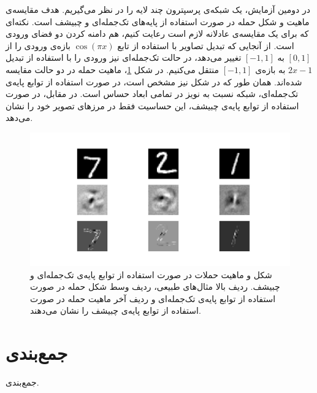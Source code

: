 \documentclass[12pt,onecolumn,a4paper]{article}
\begin{document}
در دومین آزمایش، یک شبکه‌ی پرسپترون چند لایه را در نظر می‌گیریم. هدف مقایسه‌ی ماهیت و شکل حمله در صورت استفاده از پایه‌های تک‌جمله‌ای و چبیشف است. نکته‌ای که برای یک مقایسه‌ی عادلانه لازم است رعایت کنیم، هم دامنه کردن دو فضای ورودی است. از آنجایی که تبدیل تصاویر  با استفاده از تابع $\cos(\pi x)$ بازه‌ی ورودی را از $[0,1]$ به $[-1,1]$ تغییر می‌دهد، در حالت تک‌جمله‌ای نیز ورودی را با استفاده از تبدیل $2x-1$ به بازه‌ی $[-1,1]$ منتقل می‌کنیم. در شکل \ref{fig:shape}، ماهیت حمله در دو حالت مقایسه شده‌اند. همان طور که در شکل نیز مشخص است، در صورت استفاده از توابع پایه‌ی تک‌جمله‌ای، شبکه نسبت به نویز در تمامی ابعاد حساس است. در مقابل، در صورت استفاده از توابع پایه‌ی چبیشف، این حساسیت فقط در مرزهای تصویر خود را نشان می‌دهد.
\begin{figure}[t]
	\centering
	\includegraphics[width=\linewidth]{shapeshift.png}
	\caption{شکل و ماهیت حملات در صورت استفاده از توابع پایه‌ی تک‌جمله‌ای و چبیشف. ردیف بالا مثال‌های طبیعی، ردیف وسط شکل حمله در صورت استفاده از توابع پایه‌ی تک‌جمله‌ای و ردیف آخر ماهیت حمله در صورت استفاده از توابع پایه‌ی چبیشف را نشان می‌دهند.}
	\label{fig:shape}
\end{figure}



\section{جمع‌بندی}
جمع‌بندی.
\end{document}
